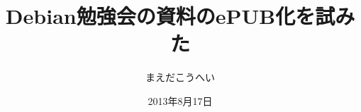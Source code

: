




\documentclass[cjk,dvipdfmx,12pt]{beamer}
\usepackage{monthlypresentation}



\title{Debian勉強会の資料のePUB化を試みた}
\subtitle{}
\author{まえだこうへい}
\date{2013年8月17日}



